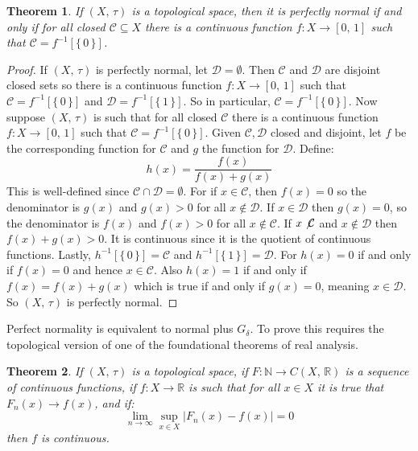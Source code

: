\documentclass{article}
\theoremstyle{plain}
\newtheorem{theorem}{Theorem}[section]
\theoremstyle{normal}
\begin{document}
        \begin{theorem}
            If $(X,\,\tau)$ is a topological space, then it is perfectly normal
            if and only if for all closed $\mathcal{C}\subseteq{X}$ there is a
            continuous function $f:X\rightarrow[0,\,1]$ such that
            $\mathcal{C}=f^{-1}[\{\,0\,\}]$.
        \end{theorem}
        \begin{proof}
            If $(X,\,\tau)$ is perfectly normal, let $\mathcal{D}=\emptyset$.
            Then $\mathcal{C}$ and $\mathcal{D}$ are disjoint closed sets so
            there is a continuous function $f:X\rightarrow[0,\,1]$ such that
            $\mathcal{C}=f^{-1}[\{\,0\,\}]$ and
            $\mathcal{D}=f^{-1}[\{\,1\,\}]$. So in particular,
            $\mathcal{C}=f^{-1}[\{\,0\,\}]$. Now suppose $(X,\,\tau)$ is such
            that for all closed $\mathcal{C}$ there is a continuous function
            $f:X\rightarrow[0,\,1]$ such that
            $\mathcal{C}=f^{-1}[\{\,0\,\}]$. Given $\mathcal{C},\mathcal{D}$
            closed and disjoint, let $f$ be the corresponding function for
            $\mathcal{C}$ and $g$ the function for $\mathcal{D}$. Define:
            \begin{equation}
                h(x)
                =\frac{f(x)}{f(x)+g(x)}
            \end{equation}
            This is well-defined since $\mathcal{C}\cap\mathcal{D}=\emptyset$.
            For if $x\in\mathcal{C}$, then $f(x)=0$ so
            the denominator is $g(x)$ and $g(x)>0$ for all $x\notin\mathcal{D}$.
            If $x\in\mathcal{D}$ then $g(x)=0$, so the denominator is
            $f(x)$ and $f(x)>0$ for all $x\notin\mathcal{C}$. If
            $x\not\mathcal{C}$ and $x\notin\mathcal{D}$ then $f(x)+g(x)>0$.
            It is continuous since it is the quotient of continuous functions.
            Lastly, $h^{-1}[\{\,0\,\}]=\mathcal{C}$ and
            $h^{-1}[\{\,1\,\}]=\mathcal{D}$. For $h(x)=0$ if and only if
            $f(x)=0$ and hence $x\in\mathcal{C}$. Also $h(x)=1$ if and only if
            $f(x)=f(x)+g(x)$ which is true if and only if $g(x)=0$, meaning
            $x\in\mathcal{D}$. So $(X,\,\tau)$ is perfectly normal.
        \end{proof}
        Perfect normality is equivalent to normal plus $G_{\delta}$. To prove
        this requires the topological version of one of the foundational
        theorems of real analysis.
        \begin{theorem}
            If $(X,\,\tau)$ is a topological space, if
            $F:\mathbb{N}\rightarrow{C}(X,\,\mathbb{R})$ is a sequence of
            continuous functions, if $f:X\rightarrow\mathbb{R}$ is
            such that for all $x\in{X}$ it is true that
            $F_{n}(x)\rightarrow{f}(x)$, and if:
            \begin{equation}
                \lim_{n\rightarrow\infty}\sup_{x\in{X}}|F_{n}(x)-f(x)|=0
            \end{equation}
            then $f$ is continuous.
        \end{theorem}
\end{document}

